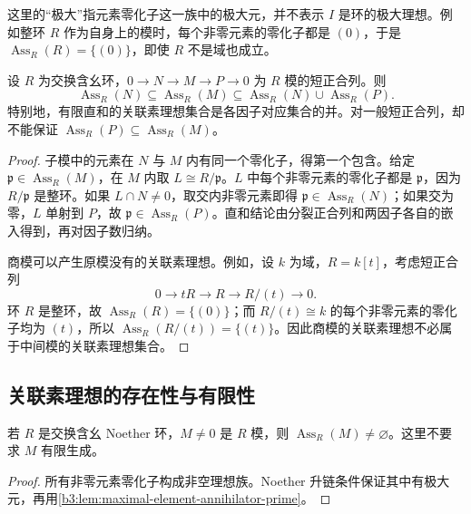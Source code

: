 这里的“极大”指元素零化子这一族中的极大元，并不表示 \(I\) 是环的极大理想。例如整环 \(R\) 作为自身上的模时，每个非零元素的零化子都是 \((0)\)，于是 \(\operatorname{Ass}_R(R)=\bigl\{(0)\bigr\}\)，即使 \(R\) 不是域也成立。

\begin{proposition}\label{b3:prop:associated-exact-sequence}
	设 \(R\) 为交换含幺环，\(0\longrightarrow N\longrightarrow M\longrightarrow P\longrightarrow0\) 为 \(R\) 模的短正合列。则
	\[
		\operatorname{Ass}_R(N)\subseteq\operatorname{Ass}_R(M) \subseteq\operatorname{Ass}_R(N)\cup\operatorname{Ass}_R(P).
	\]
	特别地，有限直和的关联素理想集合是各因子对应集合的并。对一般短正合列，却不能保证 \(\operatorname{Ass}_R(P)\subseteq\operatorname{Ass}_R(M)\)。
\end{proposition}
\begin{proof}
	子模中的元素在 \(N\) 与 \(M\) 内有同一个零化子，得第一个包含。给定 \(\mathfrak p\in\operatorname{Ass}_R(M)\)，在 \(M\) 内取 \(L\cong R/\mathfrak p\)。\(L\) 中每个非零元素的零化子都是 \(\mathfrak p\)，因为 \(R/\mathfrak p\) 是整环。如果 \(L\cap N\ne0\)，取交内非零元素即得 \(\mathfrak p\in\operatorname{Ass}_R(N)\)；如果交为零，\(L\) 单射到 \(P\)，故 \(\mathfrak p\in\operatorname{Ass}_R(P)\)。直和结论由分裂正合列和两因子各自的嵌入得到，再对因子数归纳。

	商模可以产生原模没有的关联素理想。例如，设 \(k\) 为域，\(R=k[t]\)，考虑短正合列
	\[
		0\longrightarrow tR\longrightarrow R\longrightarrow R/(t)\longrightarrow0.
	\]
	环 \(R\) 是整环，故 \(\operatorname{Ass}_R(R)=\{(0)\}\)；而 \(R/(t)\cong k\) 的每个非零元素的零化子均为 \((t)\)，所以 \(\operatorname{Ass}_R(R/(t))=\{(t)\}\)。因此商模的关联素理想不必属于中间模的关联素理想集合。
\end{proof}

\subsection{关联素理想的存在性与有限性}
\label{b3:subsec:0401:02}

\begin{theorem}\label{b3:thm:associated-existence}
	若 \(R\) 是交换含幺 Noether 环，\(M\ne0\) 是 \(R\) 模，则 \(\operatorname{Ass}_R(M)\ne\varnothing\)。这里不要求 \(M\) 有限生成。
\end{theorem}
\begin{proof}
	所有非零元素零化子构成非空理想族。Noether 升链条件保证其中有极大元，再用\cref{b3:lem:maximal-element-annihilator-prime}。
\end{proof}

